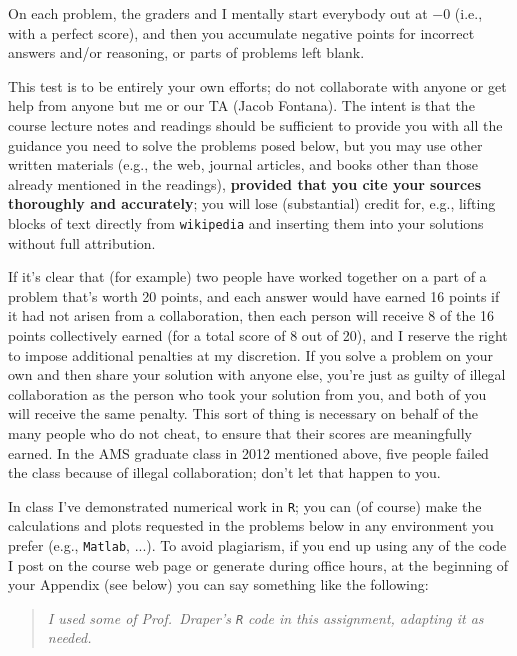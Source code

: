 \documentclass[12pt]{article}
\begin{document}
On each problem, the graders and I mentally start everybody out at $-0$ (i.e., with a perfect score), and then you accumulate negative points for incorrect answers and/or reasoning, or parts of problems left blank.

This test is to be entirely your own efforts; do not collaborate with
anyone or get help from anyone but me or our TA (Jacob Fontana). The intent is that the course lecture notes and readings should be sufficient to provide you with all the guidance you need to solve the problems posed below, but you may use other written materials (e.g., the web, journal articles, and books other than those already mentioned in the readings),
\textbf{provided that you cite your sources thoroughly and accurately}; you
will lose (substantial) credit for, e.g., lifting blocks of text directly
from \texttt{wikipedia} and inserting them into your solutions without full
attribution.

If it's clear that (for example) two people have worked together on a part
of a problem that's worth 20 points, and each answer would have earned 16
points if it had not arisen from a collaboration, then each person will
receive 8 of the 16 points collectively earned (for a total score of 8 out
of 20), and I reserve the right to impose additional penalties at my
discretion. If you solve a problem on your own and then share your solution
with anyone else, you're just as guilty of illegal collaboration as
the person who took your solution from you, and both of you will receive
the same penalty. This sort of thing is necessary on behalf of the many
people who do not cheat, to ensure that their scores are meaningfully
earned. In the AMS graduate class in 2012 mentioned above, five people failed the class because of illegal collaboration; don't let that happen to you.

In class I've demonstrated numerical work in \texttt{R}; you can (of course) make the calculations and plots requested in the problems below in any environment you prefer (e.g., \texttt{Matlab}, ...). To avoid plagiarism, if you end up using any of the code I post on the course web page or generate during office hours, at the beginning of your Appendix (see below) you can say something like the following: \vspace*{-0.1in} 

\begin{quote}

\textit{I used some of Prof.~Draper's \texttt{R} code in this assignment, adapting it as needed.} \vspace*{-0.1in} 

\end{quote}
\end{document}
